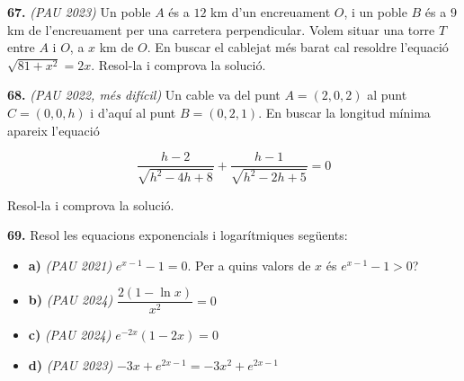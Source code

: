 \documentclass[13pt,a4paper]{extarticle}
\begin{document}
\par\noindent\begin{minipage}{\linewidth}
\textbf{67.} \emph{(PAU 2023)} Un poble $A$ és a $12$ km d'un encreuament $O$, i un poble $B$ és a $9$ km de l'encreuament per una carretera perpendicular. Volem situar una torre $T$ entre $A$ i $O$, a $x$ km de $O$. En buscar el cablejat més barat cal resoldre l'equació $\sqrt{81+x^2}=2x$. Resol-la i comprova la solució.\par
\end{minipage}\par\vspace{1.6mm}
\par\noindent\begin{minipage}{\linewidth}
\textbf{68.} \emph{(PAU 2022, més difícil)} Un cable va del punt $A=(2,0,2)$ al punt $C=(0,0,h)$ i d'aquí al punt $B=(0,2,1)$. En buscar la longitud mínima apareix l'equació

$$\frac{h-2}{\sqrt{h^2-4h+8}}+\frac{h-1}{\sqrt{h^2-2h+5}}=0$$

Resol-la i comprova la solució.\par
\end{minipage}\par\vspace{1.6mm}
\par\noindent\begin{minipage}{\linewidth}
\textbf{69.} Resol les equacions exponencials i logarítmiques següents:\par

\begin{itemize}[leftmargin=0pt,itemsep=6pt,topsep=4pt,parsep=0pt,label={}]
\item \textbf{a)} \emph{(PAU 2021)} $e^{x-1}-1=0$. Per a quins valors de $x$ és $e^{x-1}-1>0$?
\item \textbf{b)} \emph{(PAU 2024)} $\dfrac{2(1-\ln x)}{x^2}=0$
\item \textbf{c)} \emph{(PAU 2024)} $e^{-2x}(1-2x)=0$
\item \textbf{d)} \emph{(PAU 2023)} $-3x+e^{2x-1}=-3x^2+e^{2x-1}$
\end{itemize}
\end{minipage}\par\vspace{1.6mm}
\end{document}
